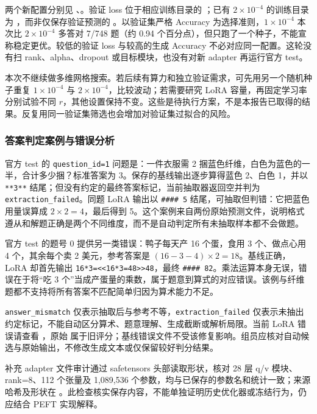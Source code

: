 \documentclass[UTF8,a4paper,12pt,fontset=none]{ctexart}
\begin{document}
两个新配置分别见 、。验证 loss 位于相应训练目录的 ；已有 $2\times10^{-4}$ 的训练目录为 ，而非仅保存验证预测的 。以验证集严格 Accuracy 为选择准则，$1\times10^{-4}$ 本次比 $2\times10^{-4}$ 多答对 7/748 题（约 0.94 个百分点），但只跑了一个种子，不能宣称稳定更优。较低的验证 loss 与较高的生成 Accuracy 不必对应同一配置。这轮没有扫 rank、alpha、dropout 或目标模块，也没有对新 adapter 再运行官方 test。

本次不继续做多维网格搜索。若后续有算力和独立验证需求，可先用另一个随机种子重复 $1\times10^{-4}$ 与 $2\times10^{-4}$，比较波动；若需要研究 LoRA 容量，再固定学习率分别试验不同 $r$，其他设置保持不变。这些是待执行方案，不是本报告已取得的结果。反复用同一验证集筛选也会增加对验证集过拟合的风险。

\subsubsection{答案判定案例与错误分析}
官方 test 的 \texttt{question\_id=1} 问题是：一件衣服需 2 捆蓝色纤维，白色为蓝色的一半，合计多少捆？标准答案为 3。保存的基线输出逐步算得蓝色 2、白色 1，并以 \texttt{**3**} 结尾；但没有约定的最终答案标记，当前抽取器返回空并判为 \texttt{extraction\_failed}。同题 LoRA 输出以 \texttt{\#\#\#\# 5} 结尾，可抽取但判错：它把蓝色用量误算成 $2\times2=4$，最后得到 5。这个案例来自两份原始预测文件，说明格式遵从和解题正确是两个不同维度，而不是自动判定所有未抽取样本都不会做题。

官方 test 的题号 0 提供另一类错误：鸭子每天产 16 个蛋，食用 3 个、做点心用 4 个，其余每个卖 2 美元，参考答案是 $(16-3-4)\times2=18$。基线正确，LoRA 却首先输出 \texttt{16*3=<<16*3=48>>48}，最终 \texttt{\#\#\#\# 82}。乘法运算本身无误，错误在于将“吃 3 个”当成产蛋量的乘数，属于题意到算式的对应错误。该例与纤维题都不支持将所有答案不匹配简单归因为算术能力不足。

\texttt{answer\_mismatch} 仅表示抽取后与参考不等，\texttt{extraction\_failed} 仅表示未抽出约定标记，不能自动区分算术、题意理解、生成截断或解析局限。当前 LoRA 错误请查看 ，原始  属于旧评分；基线错误文件不受该修复影响。组员应核对自动候选与原始输出，不修改生成文本或仅保留较好判分结果。

补充 adapter 文件审计通过 safetensors 头部读取形状，核对 28 层 q/v 模块、rank=8、112 个张量及 1,089,536 个参数，均与已保存的参数名和统计一致；来源哈希及形状在 。此检查核实保存内容，不能单独证明历史优化器或冻结行为，仍应结合 PEFT 实现解释。
\end{document}
